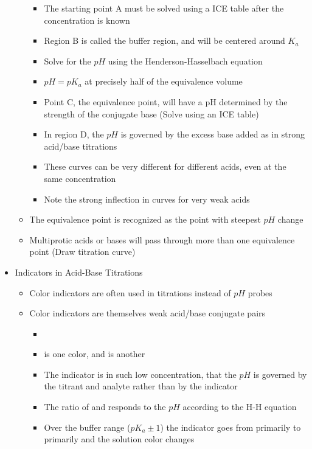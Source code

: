 \documentclass[12pt, openany, letterpaper]{memoir}
\begin{document}
\begin{itemize}
\begin{itemize}
\begin{itemize}
      \item The starting point A must be solved using a ICE table after the concentration is known
      \item Region B is called the buffer region, and will be centered around $K_a$
      \item Solve for the $pH$ using the Henderson-Hasselbach equation
      \item $pH=pK_a$ at precisely half of the equivalence volume
      \item Point C, the equivalence point, will have a pH determined by the strength of the conjugate base (Solve using an ICE table)
      \item In region D, the $pH$ is governed by the excess base added as in strong acid/base titrations
      \item These curves can be very different for different acids, even at the same concentration
      \item Note the strong inflection in curves for very weak acids
    \end{itemize}
    \item The equivalence point is recognized as the point with steepest $pH$ change	
    \item Multiprotic acids or bases will pass through more than one equivalence point (Draw titration curve)
  \end{itemize}
  \item Indicators in Acid-Base Titrations
  \begin{itemize}
    \item Color indicators are often used in titrations instead of $pH$ probes
    \item Color indicators are themselves weak acid/base conjugate pairs
    \begin{itemize}
      \item {}
      \item {} is one color, and  is another
      \item The indicator is in such low concentration, that the $pH$ is governed by the titrant and analyte rather than by the indicator
      \item The ratio of  and  responds to the $pH$ according to the H-H equation
      \item Over the buffer range ($pK_a \pm1$) the indicator goes from primarily  to primarily  and the solution color changes
    \end{itemize}

\end{itemize}
\end{itemize}
\end{document}
